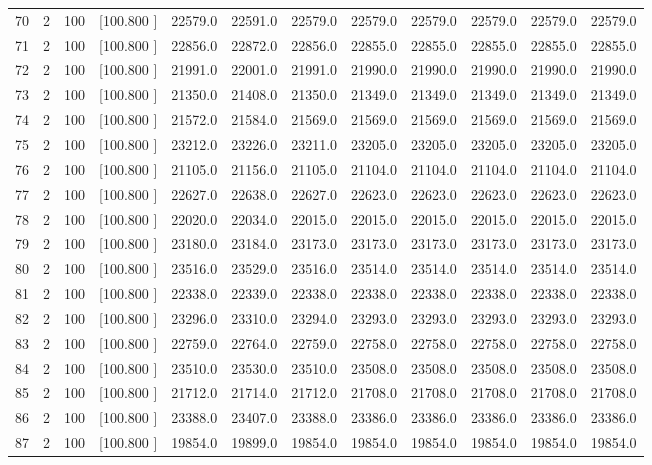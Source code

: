 \documentclass[12pt,a4paper]{article}
\begin{document}
\begin{center}
{\begin{tabular}{r r r r r r r r r r r r}
  70&  2&100&[100.800   ]& 22579.0& 22591.0& 22579.0& 22579.0& 22579.0& 22579.0& 22579.0& 22579.0\\[-0.02in]
  71&  2&100&[100.800   ]& 22856.0& 22872.0& 22856.0& 22855.0& 22855.0& 22855.0& 22855.0& 22855.0\\[-0.02in]
  72&  2&100&[100.800   ]& 21991.0& 22001.0& 21991.0& 21990.0& 21990.0& 21990.0& 21990.0& 21990.0\\[-0.02in]
  73&  2&100&[100.800   ]& 21350.0& 21408.0& 21350.0& 21349.0& 21349.0& 21349.0& 21349.0& 21349.0\\[-0.02in]
  74&  2&100&[100.800   ]& 21572.0& 21584.0& 21569.0& 21569.0& 21569.0& 21569.0& 21569.0& 21569.0\\[-0.02in]
  75&  2&100&[100.800   ]& 23212.0& 23226.0& 23211.0& 23205.0& 23205.0& 23205.0& 23205.0& 23205.0\\[-0.02in]
  76&  2&100&[100.800   ]& 21105.0& 21156.0& 21105.0& 21104.0& 21104.0& 21104.0& 21104.0& 21104.0\\[-0.02in]
  77&  2&100&[100.800   ]& 22627.0& 22638.0& 22627.0& 22623.0& 22623.0& 22623.0& 22623.0& 22623.0\\[-0.02in]
  78&  2&100&[100.800   ]& 22020.0& 22034.0& 22015.0& 22015.0& 22015.0& 22015.0& 22015.0& 22015.0\\[-0.02in]
  79&  2&100&[100.800   ]& 23180.0& 23184.0& 23173.0& 23173.0& 23173.0& 23173.0& 23173.0& 23173.0\\[-0.02in]
  80&  2&100&[100.800   ]& 23516.0& 23529.0& 23516.0& 23514.0& 23514.0& 23514.0& 23514.0& 23514.0\\[-0.02in]
  81&  2&100&[100.800   ]& 22338.0& 22339.0& 22338.0& 22338.0& 22338.0& 22338.0& 22338.0& 22338.0\\[-0.02in]
  82&  2&100&[100.800   ]& 23296.0& 23310.0& 23294.0& 23293.0& 23293.0& 23293.0& 23293.0& 23293.0\\[-0.02in]
  83&  2&100&[100.800   ]& 22759.0& 22764.0& 22759.0& 22758.0& 22758.0& 22758.0& 22758.0& 22758.0\\[-0.02in]
  84&  2&100&[100.800   ]& 23510.0& 23530.0& 23510.0& 23508.0& 23508.0& 23508.0& 23508.0& 23508.0\\[-0.02in]
  85&  2&100&[100.800   ]& 21712.0& 21714.0& 21712.0& 21708.0& 21708.0& 21708.0& 21708.0& 21708.0\\[-0.02in]
  86&  2&100&[100.800   ]& 23388.0& 23407.0& 23388.0& 23386.0& 23386.0& 23386.0& 23386.0& 23386.0\\[-0.02in]
  87&  2&100&[100.800   ]& 19854.0& 19899.0& 19854.0& 19854.0& 19854.0& 19854.0& 19854.0& 19854.0\\[-0.02in]

\end{tabular}}
\end{center}
\end{document}
